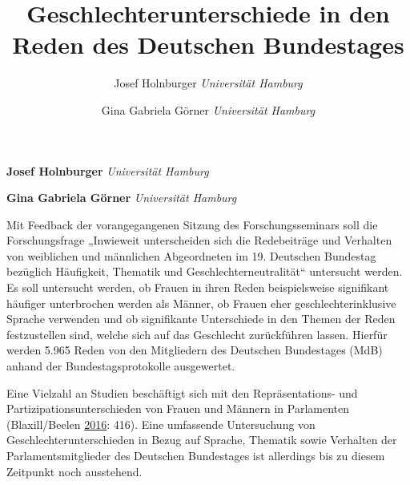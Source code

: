 \documentclass[12pt,ngerman,]{article}
\title{Geschlechterunterschiede in den Reden des Deutschen Bundestages  }
\author{\Large Josef Holnburger\vspace{0.05in} \newline\normalsize\emph{Universität Hamburg}   \and \Large Gina Gabriela Görner\vspace{0.05in} \newline\normalsize\emph{Universität Hamburg}  }
\date{}
\newcommand*{\authorfont}{\fontfamily{phv}\selectfont}
\renewenvironment{abstract}
 {{%
    \setlength{\leftmargin}{0mm}
    \setlength{\rightmargin}{\leftmargin}%
  }%
  \relax}
 {\endlist}
\begin{document}
	
%

{%
\setlength{\parindent}{0pt}
\thispagestyle{plain}
{\fontsize{18}{20}\selectfont\raggedright 
\maketitle  %

}

{
   \vskip 13.5pt\relax \normalsize\fontsize{11}{12} 
\textbf{\authorfont Josef Holnburger} \hskip 15pt \emph{\small Universität Hamburg}   \par \textbf{\authorfont Gina Gabriela Görner} \hskip 15pt \emph{\small Universität Hamburg}   

}

}








\begin{abstract}

    \hbox{\vrule height .2pt width 39.14pc}

    \vskip 8.5pt %

\noindent Mit Feedback der vorangegangenen Sitzung des Forschungsseminars soll die
Forschungsfrage „Inwieweit unterscheiden sich die Redebeiträge und
Verhalten von weiblichen und männlichen Abgeordneten im 19. Deutschen
Bundestag bezüglich Häufigkeit, Thematik und Geschlechterneutralität``
untersucht werden. \newline Es soll untersucht werden, ob Frauen in
ihren Reden beispielsweise signifikant häufiger unterbrochen werden als
Männer, ob Frauen eher geschlechterinklusive Sprache verwenden und ob
signifikante Unterschiede in den Themen der Reden festzustellen sind,
welche sich auf das Geschlecht zurückführen lassen. Hierfür werden 5.965
Reden von den Mitgliedern des Deutschen Bundestages (MdB) anhand der
Bundestagsprotokolle ausgewertet.


    \hbox{\vrule height .2pt width 39.14pc}


\end{abstract}


\vskip 6.5pt


\noindent \doublespacing Eine Vielzahl an Studien beschäftigt sich mit den Repräsentations- und
Partizipationsunterschieden von Frauen und Männern in Parlamenten
(Blaxill/Beelen \protect\hyperlink{ref-blaxill_2016}{2016}: 416). Eine
umfassende Untersuchung von Geschlechterunterschieden in Bezug auf
Sprache, Thematik sowie Verhalten der Parlamentsmitglieder des Deutschen
Bundestages ist allerdings bis zu diesem Zeitpunkt noch ausstehend.
\end{document}
